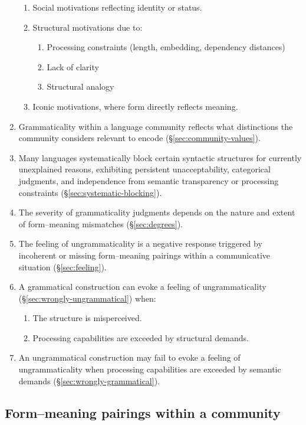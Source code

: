 \begin{enumerate}
\begin{enumerate}
            \item Social motivations reflecting identity or status.
            \item Structural motivations due to:
                \begin{enumerate}
                    \item Processing constraints (length, embedding, dependency distances)
                    \item Lack of clarity
                    \item Structural analogy
                \end{enumerate}
            \item Iconic motivations, where form directly reflects meaning.
        \end{enumerate}
    \item Grammaticality within a language community reflects what distinctions the community considers relevant to encode (\S\ref{sec:community-values}).
    \item Many languages systematically block certain syntactic structures for currently unexplained reasons, exhibiting persistent unacceptability, categorical judgments, and independence from semantic transparency or processing constraints (\S\ref{sec:systematic-blocking}).
    \item The severity of grammaticality judgments depends on the nature and extent of form--meaning mismatches (\S\ref{sec:degrees}).
    \item The feeling of ungrammaticality is a negative response triggered by incoherent or missing form--meaning pairings within a communicative situation (\S\ref{sec:feeling}).
    \item A grammatical construction can evoke a feeling of ungrammaticality (\S\ref{sec:wrongly-ungrammatical}) when:
        \begin{enumerate}
            \item The structure is misperceived.
            \item Processing capabilities are exceeded by structural demands.
        \end{enumerate}
    \item An ungrammatical construction may fail to evoke a feeling of ungrammaticality when processing capabilities are exceeded by semantic demands (\S\ref{sec:wrongly-grammatical}).
\end{enumerate}

\newpage
\subsection{Form--meaning pairings within a community}\label{sec:f-m-pair-in-community}
